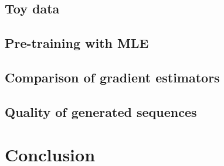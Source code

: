 \documentclass[11pt, english]{article}
\begin{document}
  \subsection{Toy data}
  
  \subsection{Pre-training with MLE}
  
  \subsection{Comparison of gradient estimators}
  
  \subsection{Quality of generated sequences}
  
  
  \section{Conclusion}
  

  
  
  
  
  
\end{document}
